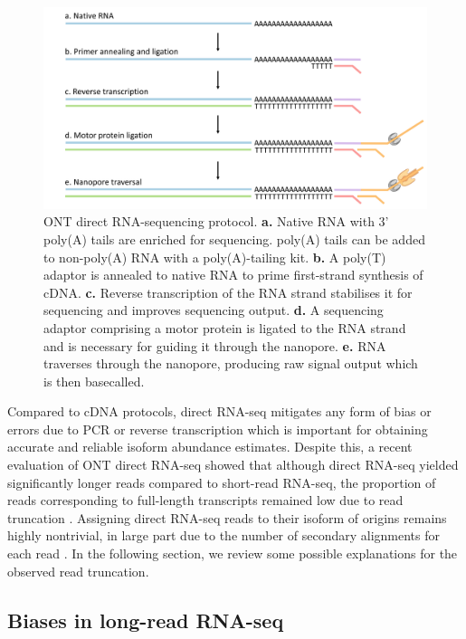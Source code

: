 \begin{figure}[H]
    \centering
    \includegraphics[width=\textwidth]{figures/sec-1-drna.png}
    \caption[ONT direct RNA-sequencing protocol]{ONT direct RNA-sequencing protocol. \textbf{a.} Native RNA with 3' poly(A) tails are enriched for sequencing. poly(A) tails can be added to non-poly(A) RNA with a poly(A)-tailing kit. \textbf{b.} A poly(T) adaptor is annealed to native RNA to prime first-strand synthesis of cDNA. \textbf{c.} Reverse transcription of the RNA strand stabilises it for sequencing and improves sequencing output. \textbf{d.} A sequencing adaptor comprising a motor protein is ligated to the RNA strand and is necessary for guiding it through the nanopore. \textbf{e.} RNA traverses through the nanopore, producing raw signal output which is then basecalled.}
    \label{fig:sec-1-drna}
\end{figure}

Compared to cDNA protocols, direct RNA-seq mitigates any form of bias or errors due to PCR or reverse transcription \cite{Garalde2018, Depledge2019} which is important for obtaining accurate and reliable isoform abundance estimates. Despite this, a recent evaluation of ONT direct RNA-seq showed that although direct RNA-seq yielded significantly longer reads compared to short-read RNA-seq, the proportion of reads corresponding to full-length transcripts remained low due to read truncation \cite{Soneson2019}. Assigning direct RNA-seq reads to their isoform of origins remains highly nontrivial, in large part due to the number of secondary alignments for each read \cite{Soneson2019}. In the following section, we review some possible explanations for the observed read truncation.   

\subsection{Biases in long-read RNA-seq}

